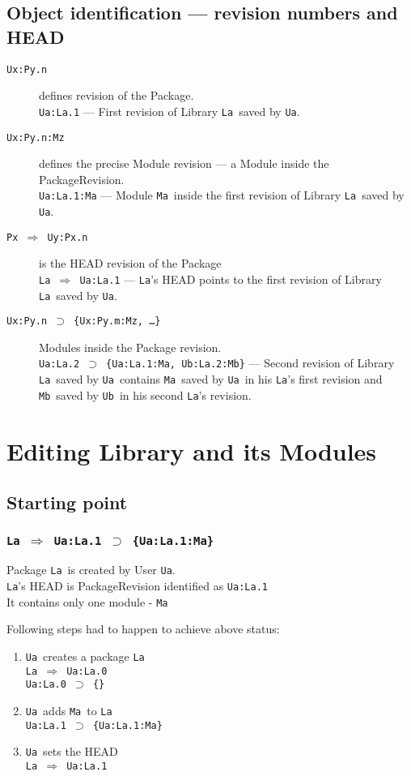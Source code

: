 \documentclass[10pt]{article}
\def\Ua{{\tt Ua}}
\def\Ub{{\tt Ub}}
\def\La{{\tt La}}
\def\Ma{{\tt Ma}}
\def\Mb{{\tt Mb}}
\def\headsto{${\Longrightarrow}$ }
\def\hto{\headsto}
\def\eq{${\supset}$ }
\begin{document}
	\subsection{Object identification --- revision numbers and HEAD}
	\begin{description}
		\item[{\tt Ux:Py.n}] defines revision of the Package.\\ 
			{\tt Ua:La.1} --- First revision of Library \La\ saved by \Ua.
		\item[{\tt Ux:Py.n:Mz}] defines the precise Module revision --- a Module inside the PackageRevision. \\ 
			{\tt Ua:La.1:Ma} --- Module \Ma\ inside the first revision of Library \La\ saved by \Ua.
		\item[{\tt Px \hto  Uy:Px.n}] is the HEAD revision of the Package\\ 
			{\tt La \hto  Ua:La.1} --- \La's HEAD points to the first revision of Library \La\ saved by \Ua.
		\item[{\tt Ux:Py.n \eq \{Ux:Py.m:Mz, \ldots\}}] Modules inside the Package revision.\\ 
			{\tt Ua:La.2 \eq \{Ua:La.1:Ma, Ub:La.2:Mb\}} --- Second revision of Library \La\ saved by \Ua\ contains \Ma\ saved by \Ua\ in his \La's first revision and \Mb\ saved by \Ub\ in his second \La's revision.
	\end{description}

\section{Editing Library and its Modules}

	\subsection{Starting point}

		\subsubsection*{{\tt La \hto  Ua:La.1 \eq \{Ua:La.1:Ma\}}}
			Package \La\ is created by User \Ua.\\
			\La's HEAD is PackageRevision identified as {\tt Ua:La.1}\\
			It contains only one module - \Ma
			
			\noindent Following steps had to happen to achieve above status:
			\begin{enumerate}
				\item{\Ua\ creates a package \La\\
				    {\tt La \hto  Ua:La.0} \\
				    {\tt Ua:La.0 \eq \{\}}
				}
				\item{\Ua\ adds \Ma\ to \La\\
					{\tt Ua:La.1 \eq \{Ua:La.1:Ma\}}
				}
				\item{\Ua\ sets the HEAD\\
					{\tt La \hto  Ua:La.1}
				}
			\end{enumerate}
			
\end{document}
